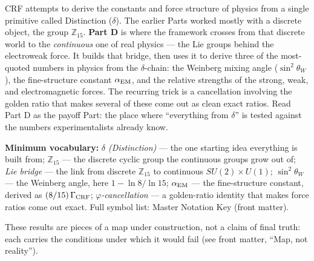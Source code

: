\documentclass[12pt, a4paper]{article}
\begin{document}
\begin{abstract}
\textbf{CRF-Specific Lock.} As in v17.5, the locked items remain
unchanged: $d_s$ definition, scaling laws, phase structure,
invariants, normalisation ($n_m = 5$, $d_s = 3$). No
\texttt{[CRITICAL CHANGE FLAG]} is raised. All updates are forward
closures or strictly additive extensions.
\end{abstract}

\tableofcontents
\newpage

\begin{keybox}[title={If you are just arriving --- Part D in plain language}]
\sloppy
CRF attempts to derive the constants and force structure of physics from a
single primitive called Distinction ($\delta$). The earlier Parts worked mostly
with a discrete object, the group $\mathbb{Z}_{15}$. \textbf{Part D} is where the
framework crosses from that discrete world to the \emph{continuous} one of real
physics --- the Lie groups behind the electroweak force. It builds that bridge,
then uses it to derive three of the most-quoted numbers in physics from the
$\delta$-chain: the Weinberg mixing angle ($\sin^2\theta_W$), the fine-structure
constant $\alpha_{\rm EM}$, and the relative strengths of the strong, weak, and
electromagnetic forces. The recurring trick is a cancellation involving the
golden ratio that makes several of these come out as clean exact ratios. Read
Part D as the payoff Part: the place where ``everything from $\delta$'' is tested
against the numbers experimentalists already know.

\textbf{Minimum vocabulary:}
\textit{$\delta$ (Distinction)} --- the one starting idea everything is built
from;\;
\textit{$\mathbb{Z}_{15}$} --- the discrete cyclic group the continuous groups
grow out of;\;
\textit{Lie bridge} --- the link from discrete $\mathbb{Z}_{15}$ to continuous
$SU(2)\times U(1)$;\;
\textit{$\sin^2\theta_W$} --- the Weinberg angle, here $1-\ln 8/\ln 15$;\;
\textit{$\alpha_{\rm EM}$} --- the fine-structure constant, derived as
$(8/15)\,\Gamma_{\rm CRF}$;\;
\textit{$\varphi$-cancellation} --- a golden-ratio identity that makes force
ratios come out exact.
Full symbol list: Master Notation Key (front matter).

These results are pieces of a map under construction, not a claim of final
truth: each carries the conditions under which it would fail (see front
matter, ``Map, not reality'').
\end{keybox}
\end{document}
